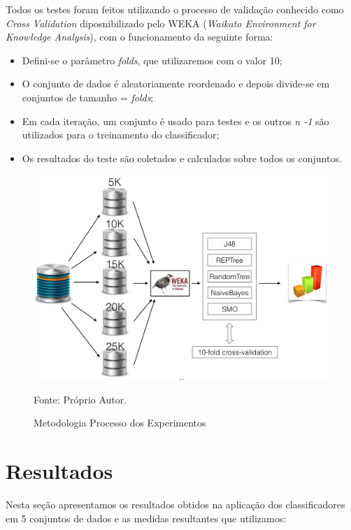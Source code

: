\documentclass[
	12pt,				%
	openright,			%
	oneside,	
	a4paper,				%
	english,				%
	brazil				%
]{abntex2/abntex2} %
\begin{document}
	Todos os testes foram feitos utilizando o processo de validação conhecido como \textit{Cross Validation} diposnibilizado pelo WEKA (\textit{Waikato Environment for Knowledge Analysis}), com o funcionamento da seguinte forma:
	\begin{itemize}
		\item Defini-se o parâmetro \textit{folds}, que utilizaremos com o valor 10;
		\item O conjunto de dados é aleatoriamente reordenado e depois divide-se em conjuntos de tamanho = \textit{folds};
		\item Em cada iteração, um conjunto é usado para testes e os outros \textit{n -1} são utilizados para o treinamento do classificador;
		\item Os resultados do teste são coletados e calculados sobre todos os conjuntos.
	\end{itemize}
	 
	
	\begin{figure}[!htb]
		\caption{\label{figmetodologiaExperimentos} Metodologia Processo dos Experimentos}
		\begin{center}
			\includegraphics[scale=0.55]{img/metodologiaExperimentos.png}
		\end{center}
		Fonte: Próprio Autor.
	\end{figure}
	
	\section{Resultados}
	
	Nesta seção apresentamos os resultados obtidos na aplicação dos classificadores em  5  conjuntos de dados e as medidas resultantes que utilizamos:
	
\end{document}
